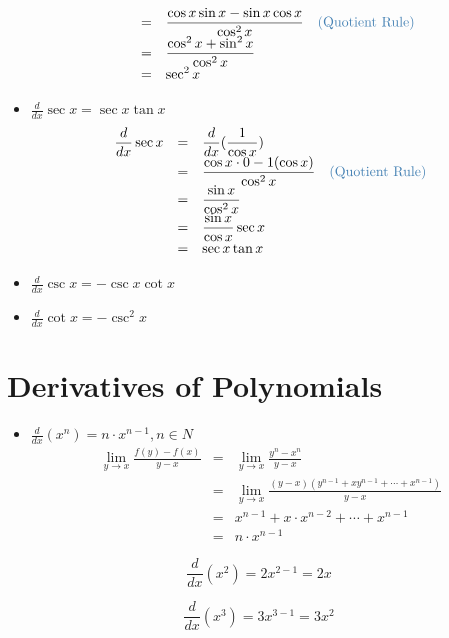 \begin{itemize}
$$\begin{array}{rcl}
& = & \displaystyle \frac{\cos x \sin x - \sin x \cos x}{\cos ^2 x} \quad \tssteelblue{\text{(Quotient Rule)}}\\
& = & \displaystyle \frac{\cos ^2 x +\sin ^2 x}{\cos ^2 x}\\
& = & \displaystyle \sec^2 x 
\end{array}$$
\item $\displaystyle \frac{d}{dx} \sec x = \sec x \tan x$
$$\begin{array}{rcl}
\displaystyle \frac{d}{dx} \sec x & = & \displaystyle \frac{d}{dx} (\frac{1}{\cos x})\\
& = & \displaystyle \frac{\cos x \cdot 0 - 1 (\cos x)}{\cos ^2 x} \quad \tssteelblue{\text{(Quotient Rule)}}\\
& = & \displaystyle \frac{\sin x }{\cos ^2 x}\\
& = & \displaystyle \frac{\sin x}{\cos x} \sec x\\
& = & \displaystyle \sec x \tan x
\end{array}$$
\item $\displaystyle \frac{d}{dx} \csc x = - \csc x \cot x$
\item $\displaystyle \frac{d}{dx} \cot x = - \csc ^2 x$
\end{itemize}

\section{Derivatives of Polynomials}
\begin{itemize}
\item $\displaystyle \frac{d}{dx} (x^n) = n \cdot x^{n-1}, n \in N$
$$\begin{array}{rcl}
\displaystyle \lim_{y \to x} \frac{f(y) - f(x)}{y - x} & = & \displaystyle \lim_{y \to x} \frac{y^n - x^n}{y - x}\\
& = & \displaystyle \lim_{y \to x} \frac{(y - x)(y^{n-1} +x y^{n-1} + \cdots + x^{n-1})}{y-x}\\
& = & \displaystyle x^{n - 1} + x \cdot x^{n-2} + \cdots + x^{n-1}\\
& = & \displaystyle n \cdot x^{n-1}
\end{array}$$
\end{itemize}

\begin{eg}
$$\displaystyle \frac{d}{dx} (x^2) = 2x^{2-1} = 2x$$
\end{eg}
\begin{eg}
$$\displaystyle \frac{d}{dx} (x^3) = 3x^{3-1} = 3x^2$$
\end{eg}

